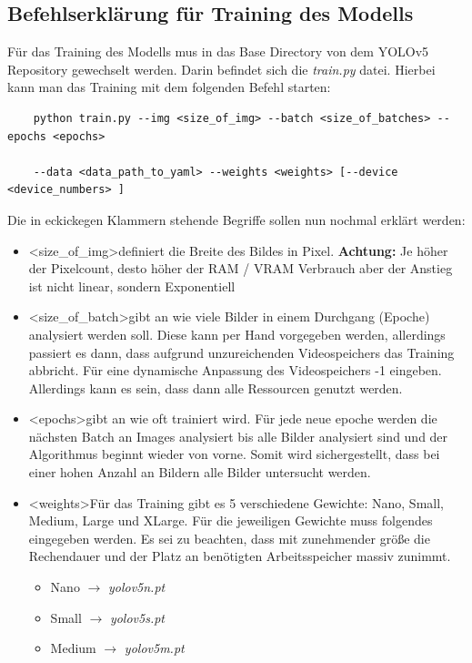 \subsection{Befehlserklärung für Training des Modells}
Für das Training des Modells mus in das  Base Directory von dem YOLOv5 Repository gewechselt werden. Darin befindet sich die \textit{train.py} datei. Hierbei kann man das Training mit dem folgenden Befehl starten:
\begin{verbatim}
    python train.py --img <size_of_img> --batch <size_of_batches> --epochs <epochs>
    
    --data <data_path_to_yaml> --weights <weights> [--device <device_numbers> ]
\end{verbatim}
Die in eckickegen Klammern stehende Begriffe sollen nun nochmal erklärt werden:
\begin{itemize}
    \item \textless size\_of\_img\textgreater definiert die Breite des Bildes in Pixel. \textbf{Achtung:} Je höher der Pixelcount, desto höher der RAM / VRAM Verbrauch aber der Anstieg ist nicht linear, sondern Exponentiell
    \item \textless size\_of\_batch\textgreater gibt an wie viele Bilder in einem Durchgang (Epoche) analysiert werden soll. Diese kann per Hand vorgegeben werden, allerdings passiert es dann, dass aufgrund unzureichenden Videospeichers das Training abbricht. Für eine dynamische Anpassung des Videospeichers -1 eingeben. Allerdings kann es sein, dass dann alle Ressourcen genutzt werden.
    \item \textless epochs\textgreater gibt an wie oft trainiert wird. Für jede neue epoche werden die nächsten Batch an Images analysiert bis alle Bilder analysiert sind und der Algorithmus beginnt wieder von vorne. Somit wird sichergestellt, dass bei einer hohen Anzahl an Bildern alle Bilder untersucht werden.
    \item \textless weights\textgreater Für das Training gibt es 5 verschiedene Gewichte: Nano, Small, Medium, Large und XLarge. Für die jeweiligen Gewichte muss folgendes eingegeben werden. Es sei zu beachten, dass mit zunehmender größe die Rechendauer und der Platz an benötigten Arbeitsspeicher massiv zunimmt.
    \begin{itemize}
        \item Nano $\rightarrow $ \textit{yolov5n.pt}
        \item Small $\rightarrow $ \textit{yolov5s.pt}
        \item Medium $\rightarrow $ \textit{yolov5m.pt}

\end{itemize}
\end{itemize}
